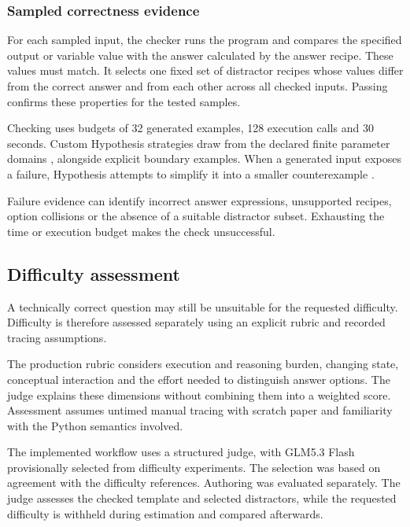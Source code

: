 \subsubsection{Sampled correctness evidence}\label{sec:sampled-evidence}

For each sampled input, the checker runs the program and compares the specified output or variable value with the answer calculated by the answer recipe. These values must match. It selects one fixed set of distractor recipes whose values differ from the correct answer and from each other across all checked inputs. Passing confirms these properties for the tested samples.

Checking uses budgets of 32 generated examples, 128 execution calls and 30 seconds. Custom Hypothesis strategies draw from the declared finite parameter domains \parencite{hypothesisdocs}, alongside explicit boundary examples. When a generated input exposes a failure, Hypothesis attempts to simplify it into a smaller counterexample \parencite{maciver2019}.

Failure evidence can identify incorrect answer expressions, unsupported recipes, option collisions or the absence of a suitable distractor subset. Exhausting the time or execution budget makes the check unsuccessful.

\subsection{Difficulty assessment}\label{sec:difficulty-design}

A technically correct question may still be unsuitable for the requested difficulty. Difficulty is therefore assessed separately using an explicit rubric and recorded tracing assumptions.

The production rubric considers execution and reasoning burden, changing state, conceptual interaction and the effort needed to distinguish answer options. The judge explains these dimensions without combining them into a weighted score. Assessment assumes untimed manual tracing with scratch paper and familiarity with the Python semantics involved.

The implemented workflow uses a structured judge, with GLM5.3 Flash provisionally selected from difficulty experiments. The selection was based on agreement with the difficulty references. Authoring was evaluated separately. The judge assesses the checked template and selected distractors, while the requested difficulty is withheld during estimation and compared afterwards.

